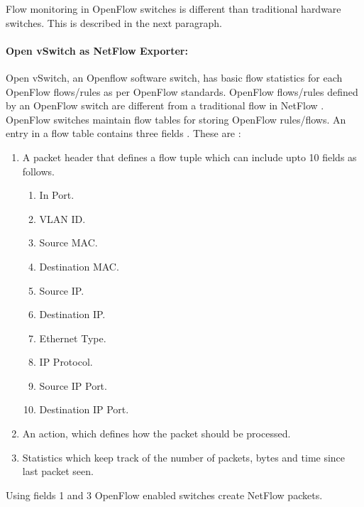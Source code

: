     Flow monitoring in OpenFlow switches is different than traditional hardware switches. This is described in the next paragraph.
    
    \paragraph{Open vSwitch as NetFlow Exporter:} Open vSwitch, an Openflow software switch, has basic flow statistics for each OpenFlow flows/rules
    as per OpenFlow standards. OpenFlow flows/rules defined by an OpenFlow switch are different from a traditional flow in NetFlow \cite{sdnnetflow}. 
    OpenFlow switches maintain flow tables for storing OpenFlow rules/flows. An entry in a flow table contains three fields . These are :
    \begin{enumerate}
     \item A packet header that defines a flow tuple which can include upto 10 fields %
     as follows.
	  \begin{enumerate}
	   \item In Port.
	   \item VLAN ID.
	   \item Source MAC.
	   \item Destination MAC.
	   \item Source IP.
	   \item Destination IP.
	   \item Ethernet Type.
	   \item IP Protocol.
	   \item Source IP Port.
	   \item Destination IP Port.
	  \end{enumerate}
      \item An action, which defines how the packet should be processed.
      \item Statistics which keep track of the number of packets, bytes and time since last packet seen.
    \end{enumerate}
    
    Using fields 1 and 3 OpenFlow enabled switches create NetFlow packets. 
    
    
